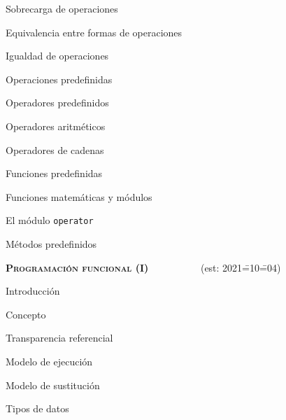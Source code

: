 \begin{longenum}
\begin{longenum}
\begin{longenum}
            \item Sobrecarga de operaciones
            \item Equivalencia entre formas de operaciones
            \item Igualdad de operaciones
        \end{longenum}
        \item Operaciones predefinidas
        \begin{longenum}
            \item Operadores predefinidos
            \begin{longenum}
                \item Operadores aritméticos
                \item Operadores de cadenas
            \end{longenum}
            \item Funciones predefinidas
            \begin{longenum}
                \item Funciones matemáticas y módulos
                \begin{longenum}
                    \item El módulo \texttt{operator}
                \end{longenum}
            \end{longenum}
            \item Métodos predefinidos
        \end{longenum}
    \end{longenum}
    \item \textbf{\textsc{Programación funcional (I)}} \ \ \ \ \ \ \ \ \ \ (est: 2021\==10\==04)
    \begin{longenum}
        \item Introducción
        \begin{longenum}
            \item Concepto
            \item Transparencia referencial
            \item Modelo de ejecución
            \begin{longenum}
                \item Modelo de sustitución
            \end{longenum}
        \end{longenum}
        \item Tipos de datos
        \begin{longenum}

\end{longenum}
\end{longenum}
\end{longenum}
